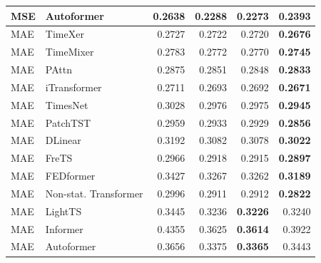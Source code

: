 \begin{longtable}{llrrrr}
MSE & Autoformer & 0.2638 & 0.2288 & \textbf{0.2273} & 0.2393 \\
\midrule
MAE & TimeXer & 0.2727 & 0.2722 & 0.2720 & \textbf{0.2676} \\
MAE & TimeMixer & 0.2783 & 0.2772 & 0.2770 & \textbf{0.2745} \\
MAE & PAttn & 0.2875 & 0.2851 & 0.2848 & \textbf{0.2833} \\
MAE & iTransformer & 0.2711 & 0.2693 & 0.2692 & \textbf{0.2671} \\
MAE & TimesNet & 0.3028 & 0.2976 & 0.2975 & \textbf{0.2945} \\
MAE & PatchTST & 0.2959 & 0.2933 & 0.2929 & \textbf{0.2856} \\
MAE & DLinear & 0.3192 & 0.3082 & 0.3078 & \textbf{0.3022} \\
MAE & FreTS & 0.2966 & 0.2918 & 0.2915 & \textbf{0.2897} \\
MAE & FEDformer & 0.3427 & 0.3267 & 0.3262 & \textbf{0.3189} \\
MAE & Non-stat. Transformer & 0.2996 & 0.2911 & 0.2912 & \textbf{0.2822} \\
MAE & LightTS & 0.3445 & 0.3236 & \textbf{0.3226} & 0.3240 \\
MAE & Informer & 0.4355 & 0.3625 & \textbf{0.3614} & 0.3922 \\
MAE & Autoformer & 0.3656 & 0.3375 & \textbf{0.3365} & 0.3443 \\
\end{longtable}
\endgroup

